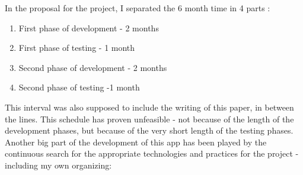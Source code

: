 \documentclass{article}
\begin{document}
In the proposal for the project, I separated the 6 month time in 4 parts : 
\begin{enumerate}
  \item First phase of development - 2 months
  \item First phase of testing - 1 month
  \item Second phase of development - 2 months
  \item Second phase of testing -1 month  
\end{enumerate}

This interval was also supposed to include the writing of this paper, in between
the lines. This schedule has proven unfeasible - not because of the
length of the development phases, but because of the very short length of the
testing phases. Another big part of the development of this app has been played
by the continuous search for the appropriate technologies and practices for the
project - including my own organizing:
\end{document}
